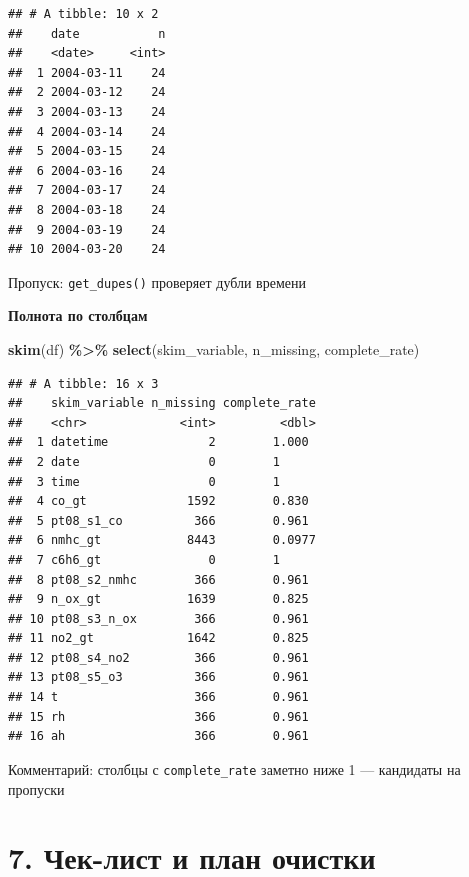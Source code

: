 \documentclass[
]{article}
\newenvironment{Shaded}{\begin{snugshade}}{\end{snugshade}}
\newcommand{\FunctionTok}[1]{\textcolor[rgb]{0.13,0.29,0.53}{\textbf{#1}}}
\newcommand{\NormalTok}[1]{#1}
\newcommand{\SpecialCharTok}[1]{\textcolor[rgb]{0.81,0.36,0.00}{\textbf{#1}}}
\begin{document}
\begin{verbatim}
## # A tibble: 10 x 2
##    date           n
##    <date>     <int>
##  1 2004-03-11    24
##  2 2004-03-12    24
##  3 2004-03-13    24
##  4 2004-03-14    24
##  5 2004-03-15    24
##  6 2004-03-16    24
##  7 2004-03-17    24
##  8 2004-03-18    24
##  9 2004-03-19    24
## 10 2004-03-20    24
\end{verbatim}

Пропуск: \texttt{get\_dupes()} проверяет дубли времени

\textbf{Полнота по столбцам}

\begin{Shaded}
\begin{Highlighting}[]
\FunctionTok{skim}\NormalTok{(df) }\SpecialCharTok{\%\textgreater{}\%}
  \FunctionTok{select}\NormalTok{(skim\_variable, n\_missing, complete\_rate)}
\end{Highlighting}
\end{Shaded}

\begin{verbatim}
## # A tibble: 16 x 3
##    skim_variable n_missing complete_rate
##    <chr>             <int>         <dbl>
##  1 datetime              2        1.000 
##  2 date                  0        1     
##  3 time                  0        1     
##  4 co_gt              1592        0.830 
##  5 pt08_s1_co          366        0.961 
##  6 nmhc_gt            8443        0.0977
##  7 c6h6_gt               0        1     
##  8 pt08_s2_nmhc        366        0.961 
##  9 n_ox_gt            1639        0.825 
## 10 pt08_s3_n_ox        366        0.961 
## 11 no2_gt             1642        0.825 
## 12 pt08_s4_no2         366        0.961 
## 13 pt08_s5_o3          366        0.961 
## 14 t                   366        0.961 
## 15 rh                  366        0.961 
## 16 ah                  366        0.961
\end{verbatim}

Комментарий: столбцы с \texttt{complete\_rate} заметно ниже 1 ---
кандидаты на пропуски

\section{7. Чек-лист и план
очистки}\label{ux447ux435ux43a-ux43bux438ux441ux442-ux438-ux43fux43bux430ux43d-ux43eux447ux438ux441ux442ux43aux438}
\end{document}
